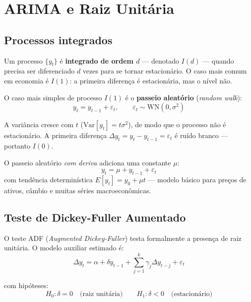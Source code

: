 \chapter{ARIMA e Raiz Unitária}
\label{cap:arima}

\section{Processos integrados}

Um processo $\{y_t\}$ é \textbf{integrado de ordem $d$} — denotado $I(d)$
— quando precisa ser diferenciado $d$ vezes para se tornar estacionário.
O caso mais comum em economia é $I(1)$: a primeira diferença é estacionária,
mas o nível não.

O caso mais simples de processo $I(1)$ é o \textbf{passeio aleatório}
(\emph{random walk}):
\[
  y_t = y_{t-1} + \varepsilon_t, \qquad \varepsilon_t \sim \mathrm{WN}(0, \sigma^2)
\]

A variância cresce com $t$ ($\mathrm{Var}[y_t] = t\sigma^2$), de modo que
o processo não é estacionário. A primeira diferença $\Delta y_t = y_t -
y_{t-1} = \varepsilon_t$ é ruído branco — portanto $I(0)$.

O passeio aleatório \emph{com deriva} adiciona uma constante $\mu$:
\[
  y_t = \mu + y_{t-1} + \varepsilon_t
\]
com tendência determinística $E[y_t] = y_0 + \mu t$ — modelo básico para
preços de ativos, câmbio e muitas séries macroeconômicas.

\section{Teste de Dickey-Fuller Aumentado}

O teste ADF (\emph{Augmented Dickey-Fuller}) testa formalmente a presença de
raiz unitária. O modelo auxiliar estimado é:
\[
  \Delta y_t = \alpha + \delta y_{t-1}
               + \sum_{j=1}^{k} \gamma_j \Delta y_{t-j} + \varepsilon_t
\]

com hipóteses:
\[
  H_0: \delta = 0 \quad \text{(raiz unitária)} \qquad
  H_1: \delta < 0 \quad \text{(estacionário)}
\]

